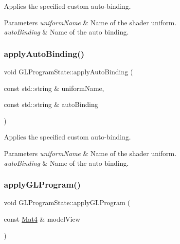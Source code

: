 Applies the specified custom auto-\/binding.


\begin{DoxyParams}{Parameters}
{\em uniform\+Name} & Name of the shader uniform. \\
\hline
{\em auto\+Binding} & Name of the auto binding. \\
\hline
\end{DoxyParams}
\mbox{\label{classGLProgramState_a495c04e63419504e616bae7795bf0af9}} 
\subsubsection{\texorpdfstring{apply\+Auto\+Binding()}{applyAutoBinding()}\hspace{0.1cm}{\footnotesize\ttfamily [2/2]}}
{\footnotesize\ttfamily void G\+L\+Program\+State\+::apply\+Auto\+Binding (\begin{DoxyParamCaption}\item[{const std\+::string \&}]{uniform\+Name,  }\item[{const std\+::string \&}]{auto\+Binding }\end{DoxyParamCaption})}

Applies the specified custom auto-\/binding.


\begin{DoxyParams}{Parameters}
{\em uniform\+Name} & Name of the shader uniform. \\
\hline
{\em auto\+Binding} & Name of the auto binding. \\
\hline
\end{DoxyParams}
\mbox{\label{classGLProgramState_a2caeee298087f126c4460752a6f42bc5}} 
\subsubsection{\texorpdfstring{apply\+G\+L\+Program()}{applyGLProgram()}\hspace{0.1cm}{\footnotesize\ttfamily [1/2]}}
{\footnotesize\ttfamily void G\+L\+Program\+State\+::apply\+G\+L\+Program (\begin{DoxyParamCaption}\item[{const \hyperlink{classMat4}{Mat4} \&}]{model\+View }\end{DoxyParamCaption})}

